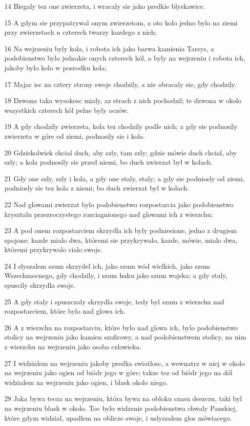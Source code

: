 \par 14 Biegaly tez one zwierzeta, i wracaly sie jako predkie blyskawice.
\par 15 A gdym sie przypatrywal onym zwierzetom, a oto kolo jedno bylo na ziemi przy zwierzetach u czterech twarzy kazdego z nich;
\par 16 Na wejrzeniu byly kola, i robota ich jako barwa kamienia Tarsys, a podobienstwo bylo jednakie onych czterech kól, a byly na wejrzeniu i robota ich, jakoby bylo kolo w posrodku kola;
\par 17 Majac isc na cztery strony swoje chodzily, a nie obracaly sie, gdy chodzily.
\par 18 Dzwona taka wysokosc mialy, az strach z nich pochodzil; te dzwona w okolo wszystkich czterech kól pelne byly oczów.
\par 19 A gdy chodzily zwierzeta, kola tez chodzily podle nich; a gdy sie podnosily zwierzeta w góre od ziemi, podnosily sie i kola.
\par 20 Gdziekolwiek chcial duch, aby szly, tam szly; gdzie mówie duch chcial, aby szly; a kola podnosily sie przed niemi, bo duch zwierzat byl w kolach.
\par 21 Gdy one szly, szly i kola, a gdy one staly, staly; a gdy sie podniosly od ziemi, podniosly sie tez kola z niemi; bo duch zwierzat byl w kolach.
\par 22 Nad glowami zwierzat bylo podobienstwo rozpostarcia jako podobienstwo krysztalu przezroczystego rozciagnionego nad glowami ich z wierzchu;
\par 23 A pod onem rozpostarciem skrzydla ich byly podniesione, jedno z drugiem spojone; kazde mialo dwa, któremi sie przykrywalo, kazde, mówie, mialo dwa, któremi przykrywalo cialo swoje.
\par 24 I slyszalem szum skrzydel ich, jako szum wód wielkich, jako szum Wszechmocnego, gdy chodzily, i szum huku jako szum wojska; a gdy staly, spuscily skrzydla swoje.
\par 25 A gdy staly i spuszczaly skrzydla swoje, tedy byl szum z wierzchu nad rozpostarciem, które bylo nad glowa ich.
\par 26 A z wierzchu na rozpostarciu, które bylo nad glowa ich, bylo podobienstwo stolicy na wejrzeniu jako kamien szafirowy, a nad podobienstwem stolicy, na nim z wierzchu na wejrzeniu jako osoba czlowieka.
\par 27 I widzialem na wejrzeniu jakoby predka swiatlosc, a wewnatrz w niej w okolo na wejrzeniu jako ogien od biódr jego w góre; takze tez od biódr jego na dól widzialem na wejrzeniu jako ogien, i blask okolo niego.
\par 28 Jaka bywa tecza na wejrzeniu, która bywa na obloku czasu deszczu, taki byl na wejrzeniu blask w okolo. Toc bylo widzenie podobienstwa chwaly Panskiej, które gdym widzial, upadlem na oblicze swoje, i uslyszalem glos mówiacego.

